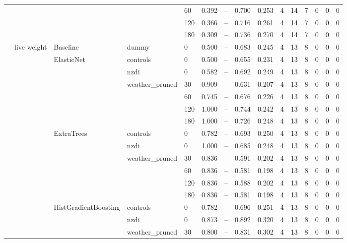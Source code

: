 \begin{longtable}{lllllrrrrrrrrrr}
 &  &  &  & 60 & 0.392 & -- & 0.700 & 0.253 & 4 & 14 & 7 & 0 & 0 & 0 \\
 &  &  &  & 120 & 0.366 & -- & 0.716 & 0.261 & 4 & 14 & 7 & 0 & 0 & 0 \\
 &  &  &  & 180 & 0.309 & -- & 0.736 & 0.270 & 4 & 14 & 7 & 0 & 0 & 0 \\
\cline{2-15} \cline{3-15} \cline{4-15}
 & \multirow[t]{31}{*}{live weight} & Baseline & dummy & 0 & 0.500 & -- & 0.683 & 0.245 & 4 & 13 & 8 & 0 & 0 & 0 \\
\cline{3-15} \cline{4-15}
 &  & \multirow[t]{6}{*}{ElasticNet} & controls & 0 & 0.500 & -- & 0.655 & 0.231 & 4 & 13 & 8 & 0 & 0 & 0 \\
\cline{4-15}
 &  &  & nzdi & 0 & 0.582 & -- & 0.692 & 0.249 & 4 & 13 & 8 & 0 & 0 & 0 \\
\cline{4-15}
 &  &  & \multirow[t]{4}{*}{weather_pruned} & 30 & 0.909 & -- & 0.631 & 0.207 & 4 & 13 & 8 & 0 & 0 & 0 \\
 &  &  &  & 60 & 0.745 & -- & 0.676 & 0.226 & 4 & 13 & 8 & 0 & 0 & 0 \\
 &  &  &  & 120 & 1.000 & -- & 0.744 & 0.242 & 4 & 13 & 8 & 0 & 0 & 0 \\
 &  &  &  & 180 & 1.000 & -- & 0.726 & 0.248 & 4 & 13 & 8 & 0 & 0 & 0 \\
\cline{3-15} \cline{4-15}
 &  & \multirow[t]{6}{*}{ExtraTrees} & controls & 0 & 0.782 & -- & 0.693 & 0.250 & 4 & 13 & 8 & 0 & 0 & 0 \\
\cline{4-15}
 &  &  & nzdi & 0 & 1.000 & -- & 0.685 & 0.248 & 4 & 13 & 8 & 0 & 0 & 0 \\
\cline{4-15}
 &  &  & \multirow[t]{4}{*}{weather_pruned} & 30 & 0.836 & -- & 0.591 & 0.202 & 4 & 13 & 8 & 0 & 0 & 0 \\
 &  &  &  & 60 & 0.836 & -- & 0.581 & 0.198 & 4 & 13 & 8 & 0 & 0 & 0 \\
 &  &  &  & 120 & 0.836 & -- & 0.588 & 0.202 & 4 & 13 & 8 & 0 & 0 & 0 \\
 &  &  &  & 180 & 0.836 & -- & 0.581 & 0.198 & 4 & 13 & 8 & 0 & 0 & 0 \\
\cline{3-15} \cline{4-15}
 &  & \multirow[t]{6}{*}{HistGradientBoosting} & controls & 0 & 0.782 & -- & 0.696 & 0.251 & 4 & 13 & 8 & 0 & 0 & 0 \\
\cline{4-15}
 &  &  & nzdi & 0 & 0.873 & -- & 0.892 & 0.320 & 4 & 13 & 8 & 0 & 0 & 0 \\
\cline{4-15}
 &  &  & \multirow[t]{4}{*}{weather_pruned} & 30 & 0.800 & -- & 0.831 & 0.302 & 4 & 13 & 8 & 0 & 0 & 0 \\

\end{longtable}
